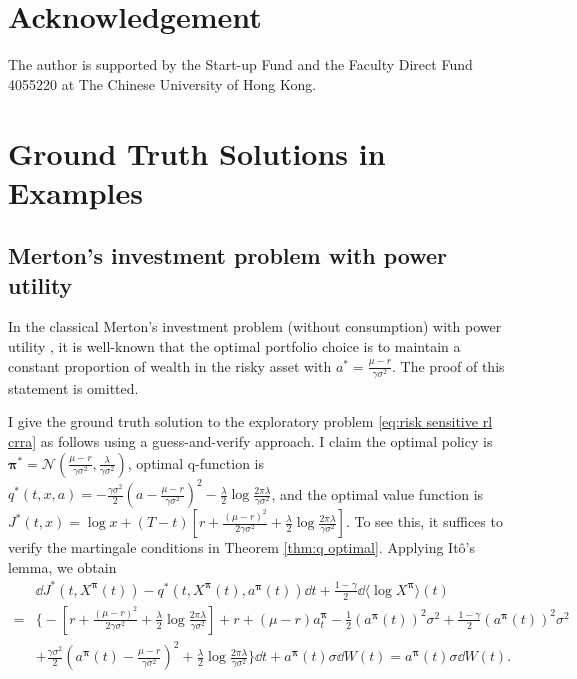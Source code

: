 \section*{Acknowledgement}
The author is supported by the Start-up Fund and the Faculty Direct Fund 4055220 at The Chinese University of Hong Kong.



\newpage

\appendix
\section{Ground Truth Solutions in Examples}
\subsection{Merton's investment problem with power utility}
\label{sec:merton true solution}
In the classical Merton's investment problem (without consumption) with power utility \citep{merton1969lifetime}, it is well-known that the optimal portfolio choice is to maintain a constant proportion of wealth in the risky asset with $a^* = \frac{\mu-r}{\gamma \sigma^2}$. The proof of this statement is omitted.

I give the ground truth solution to the exploratory problem \eqref{eq:risk sensitive rl crra} as follows using a guess-and-verify approach. I claim the optimal policy is $\bm\pi^* = \mathcal{N}(\frac{\mu-r}{\gamma\sigma^2}, \frac{\lambda}{\gamma \sigma^2})$, optimal q-function is $q^*(t,x,a) = -\frac{\gamma\sigma^2}{2}(a - \frac{\mu-r}{\gamma\sigma^2})^2 - \frac{\lambda}{2}\log\frac{2\pi\lambda}{\gamma\sigma^2}$, and  the optimal value function is $J^*(t,x) = \log x + (T-t)[r + \frac{(\mu-r)^2}{2\gamma\sigma^2} + \frac{\lambda}{2}\log\frac{2\pi\lambda}{\gamma\sigma^2}]$. To see this, it suffices to verify the martingale conditions in Theorem \ref{thm:q optimal}. Applying It\^o's lemma, we obtain
\[\begin{aligned}
& \dd J^*(t,X^{\bm\pi}(t)) -q^*(t,X^{\bm\pi}(t),a^{\bm\pi}(t))\dd t + \frac{1-\gamma}{2}\dd \langle \log X^{\bm\pi} \rangle(t) \\
= & \bigg\{ -\left[ r + \frac{(\mu-r)^2}{2\gamma\sigma^2} + \frac{\lambda}{2}\log\frac{2\pi\lambda}{\gamma\sigma^2} \right] + r + (\mu-r) a_t^{\bm\pi} - \frac{1}{2}(a^{\bm\pi}(t))^2\sigma^2 + \frac{1-\gamma}{2}(a^{\bm\pi}(t))^2\sigma^2 \\
& + \frac{\gamma\sigma^2}{2}(a^{\bm\pi}(t) - \frac{\mu-r}{\gamma\sigma^2})^2 + \frac{\lambda}{2}\log\frac{2\pi\lambda}{\gamma\sigma^2} \bigg\}\dd t + a^{\bm\pi}(t)\sigma\dd W(t) = a^{\bm\pi}(t)\sigma\dd W(t) .
\end{aligned} \]


